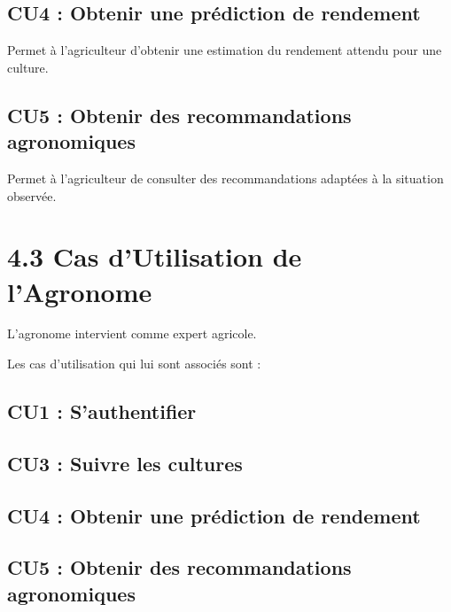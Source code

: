 \documentclass[
]{book}
\begin{document}
\hypertarget{cu4-obtenir-une-pruxe9diction-de-rendement}{%
\subsection{CU4 : Obtenir une prédiction de
rendement}\label{cu4-obtenir-une-pruxe9diction-de-rendement}}

Permet à l'agriculteur d'obtenir une estimation du rendement attendu
pour une culture.

\hypertarget{cu5-obtenir-des-recommandations-agronomiques}{%
\subsection{CU5 : Obtenir des recommandations
agronomiques}\label{cu5-obtenir-des-recommandations-agronomiques}}

Permet à l'agriculteur de consulter des recommandations adaptées à la
situation observée.

\hypertarget{cas-dutilisation-de-lagronome}{%
\section{4.3 Cas d'Utilisation de
l'Agronome}\label{cas-dutilisation-de-lagronome}}

L'agronome intervient comme expert agricole.

Les cas d'utilisation qui lui sont associés sont :

\hypertarget{cu1-sauthentifier-1}{%
\subsection{CU1 : S'authentifier}\label{cu1-sauthentifier-1}}

\hypertarget{cu3-suivre-les-cultures-1}{%
\subsection{CU3 : Suivre les cultures}\label{cu3-suivre-les-cultures-1}}

\hypertarget{cu4-obtenir-une-pruxe9diction-de-rendement-1}{%
\subsection{CU4 : Obtenir une prédiction de
rendement}\label{cu4-obtenir-une-pruxe9diction-de-rendement-1}}

\hypertarget{cu5-obtenir-des-recommandations-agronomiques-1}{%
\subsection{CU5 : Obtenir des recommandations
agronomiques}\label{cu5-obtenir-des-recommandations-agronomiques-1}}
\end{document}
